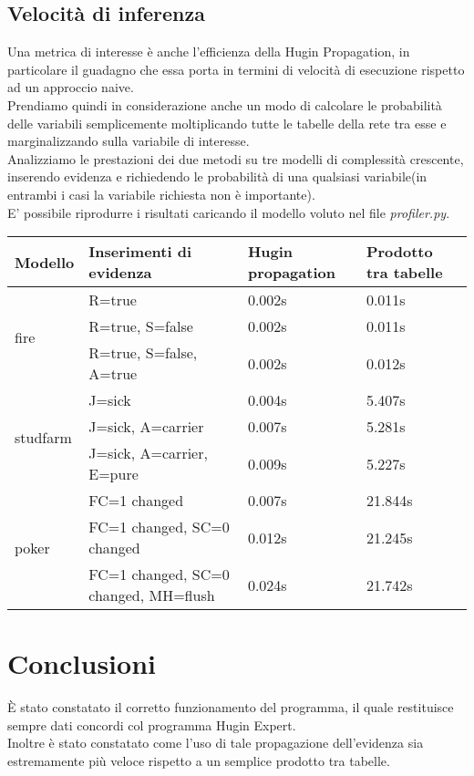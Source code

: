 \documentclass[a4paper]{article}
\begin{document}
\subsection{Velocità di inferenza}
Una metrica di interesse è anche l'efficienza della Hugin Propagation, in particolare il guadagno che essa porta in termini di velocità di esecuzione rispetto ad un approccio naive.\\
Prendiamo quindi in considerazione anche un modo di calcolare le probabilità delle variabili semplicemente moltiplicando tutte le tabelle della rete tra esse e marginalizzando sulla variabile di interesse.\\
Analizziamo le prestazioni dei due metodi su tre modelli di complessità crescente, inserendo evidenza e richiedendo le probabilità di una qualsiasi variabile(in entrambi i casi la variabile richiesta non è importante).\\
E' possibile riprodurre i risultati caricando il modello voluto nel file \emph{profiler.py}.


\begin{table}[H]
\begin{tabular}{|l|l||l|l|}\hline
   Modello  & Inserimenti di evidenza  & Hugin propagation & Prodotto tra tabelle \\ \hline
  \multirow{3}{*}{fire} & R=true & 0.002s & 0.011s \\ \cline{2-4}
  & R=true, S=false& 0.002s & 0.011s \\ \cline{2-4}
  & R=true, S=false, A=true & 0.002s & 0.012s \\ \hline
    \multirow{3}{*}{studfarm} & J=sick & 0.004s & 5.407s \\ \cline{2-4}
  & J=sick, A=carrier & 0.007s & 5.281s \\ \cline{2-4}
  & J=sick, A=carrier, E=pure & 0.009s & 5.227s \\ \hline
    \multirow{3}{*}{poker} & FC=1 changed & 0.007s & 21.844s \\ \cline{2-4}
  & FC=1 changed, SC=0 changed & 0.012s & 21.245s \\ \cline{2-4}
  & FC=1 changed, SC=0 changed, MH=flush & 0.024s & 21.742s \\ \hline
  
\end{tabular}

\end{table}

\section{Conclusioni}
È stato constatato il corretto funzionamento del programma, il quale restituisce sempre dati concordi col programma Hugin Expert.\\
Inoltre è stato constatato come l'uso di tale propagazione dell'evidenza sia estremamente più veloce rispetto a un semplice prodotto tra tabelle.
\end{document}
